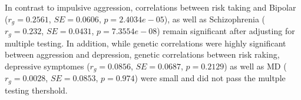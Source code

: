 In contrast to impulsive aggression, correlations between risk taking and Bipolar ($r_g=0.2561$, $SE=0.0606$, $p=2.4034e-05$), as well as Schizophrenia ($r_g=0.232$, $SE=0.0431$, $p=7.3554e-08$) remain significant after adjusting for multiple testing.
In addition, while genetic correlations were highly significant between aggression and depression, genetic correlations between risk raking, depressive symptomes ($r_g=0.0856$, $SE=0.0687$, $p=0.2129$) as well as MD ($r_g=0.0028$, $SE=0.0853$, $p=0.974$) were small and did not pass the multple testing thershold.
